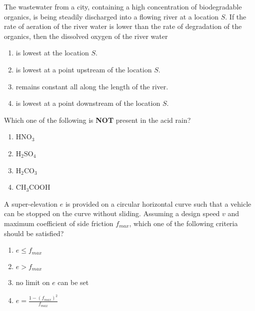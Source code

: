  \iffalse
    \title{Assignment}
    \author{EE24BTECH11035}
    \section{ce}
    \chapter{2017}
  \fi
\item The wastewater from a city, containing a high concentration of biodegradable organics, is being steadily discharged into a flowing river at a location $S$. If the rate of aeration of the river water is lower than the rate of degradation of the organics, then the dissolved oxygen of the river water
    \begin{enumerate}
        \item is lowest at the location $S$.
        \item is lowest at a point upstream of the location $S$.
        \item remains constant all along the length of the river.
        \item is lowest at a point downstream of the location $S$.
    \end{enumerate}

\item Which one of the following is \textbf{NOT} present in the acid rain?
    \begin{enumerate}
        \item HNO$_3$
        \item H$_2$SO$_4$
        \item H$_2$CO$_3$
        \item CH$_3$COOH
    \end{enumerate}

\item A super-elevation $e$ is provided on a circular horizontal curve such that a vehicle can be stopped on the curve without sliding. Assuming a design speed $v$ and maximum coefficient of side friction $f_{max}$, which one of the following criteria should be satisfied?
    \begin{enumerate}
        \item $e \leq f_{max}$
        \item $e > f_{max}$
        \item no limit on $e$ can be set
        \item $e = \frac{1 - (f_{max})^2}{f_{max}}$
    \end{enumerate}

